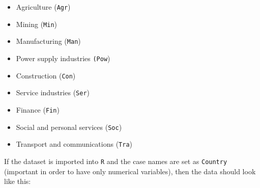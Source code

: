 \documentclass[]{book}
\providecommand{\tightlist}{%
  \setlength{\itemsep}{0pt}\setlength{\parskip}{0pt}}
\theoremstyle{definition}
\theoremstyle{definition}
\theoremstyle{definition}
\theoremstyle{remark}
\begin{document}
\begin{itemize}
\tightlist
\item
  Agriculture (\texttt{Agr})
\item
  Mining (\texttt{Min})
\item
  Manufacturing (\texttt{Man})
\item
  Power supply industries \texttt{(Pow})
\item
  Construction (\texttt{Con})
\item
  Service industries (\texttt{Ser})
\item
  Finance (\texttt{Fin})
\item
  Social and personal services (\texttt{Soc})
\item
  Transport and communications (\texttt{Tra})
\end{itemize}

If the dataset is imported into \texttt{R} and the case names are set as
\texttt{Country} (important in order to have only numerical variables),
then the data should look like this:
\end{document}
